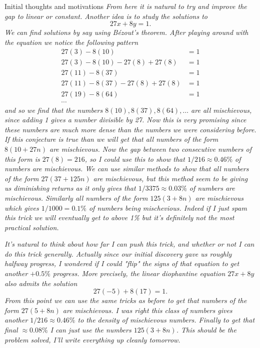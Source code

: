 \documentclass{article}
\begin{document}
\begin{hint}{Initial thoughts and motivations}
\textit{From here it is natural to try and improve the gap to linear
or constant. Another idea is to study the solutions to }
$$
27x + 8y = 1.
$$
\textit{We can find solutions by say using Bézout's theorem. After
playing around with the equation we notice the following pattern}
\[
\begin{aligned}
27(3) - 8(10) &= 1 \\
27(3) - 8(10) - 27(8) + 27(8) &= 1\\
27(11) - 8(37) &= 1 \\
27(11) - 8(37) - 27(8) + 27(8) &= 1 \\
27(19) - 8(64) &= 1 \\
\cdots
\end{aligned}
\]
\textit{and so we find that the numbers $8(10), 8(37), 8(64), \ldots$
are all mischievous, since adding 1 gives a number divisible by 27.
Now this is very promising since these numbers are
much more dense than the numbers we were considering before. If this
conjecture is true than we will get that all numbers of the form
$8(10 + 27n)$ are mischievous. Now the gap between two consecutive numbers
of this form is $27(8) = 216$, so I could use this to show that
$1/216 \approx 0.46 \%$ of numbers are mischievous.
We can use similar
methods to show that all numbers of the form $27(37 + 125n)$ are
mischievous, but this method seem to be giving us diminishing returns as
it only gives that $1/3375 \approx 0.03 \%$ of numbers are
mischievous. Similarly
all numbers of the form $125(3 + 8n)$ are mischievous which gives
$1/1000 = 0.1\%$ of numbers being mischevious.
Indeed if I just spam this trick we will eventually get to
above 1\% but it's definitely not the most practical solution.}
\vspace{0.2cm}

\textit{It's natural to think about how far I can push this trick, and
whether or not I can do this trick generally. Actually since our initial
discovery gave us roughly halfway progress, I wondered if I could
"flip" the signs of that equation to get another $+ 0.5\%$ progress. More
precisely, the linear diophantine equation $27x + 8y$ also admits the
solution}
$$
27(-5) + 8(17) = 1.
$$
\textit{From this point we can use the same tricks as before to get that
numbers of the form $27(5 + 8n)$ are mischievous. I was right this class
of numbers gives another $1/216 \approx 0.46 \%$ to the density of
mischievous numbers. Finally to get that final $\approx 0.08\%$ I can
just use the numbers $125(3+8n)$. This should be the problem solved,
I'll write everything up cleanly tomorrow.}
\end{hint}
\newpage
\end{document}
